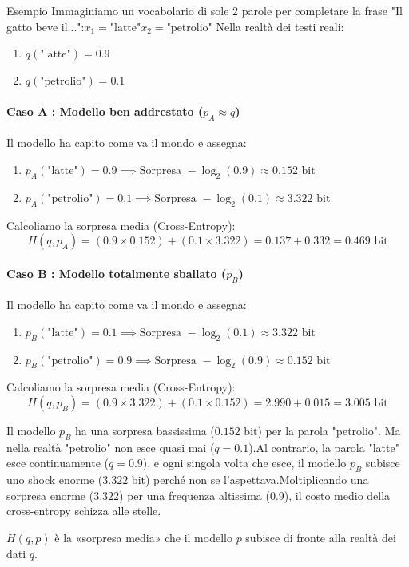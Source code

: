 \begin{example}{Esempio}
    Immaginiamo un vocabolario di sole 2 parole per completare la frase "Il gatto beve il...":$x_1 = \text{"latte"}$$x_2 = \text{"petrolio"}$
    Nella realtà dei testi reali:
    \begin{enumerate}
        \item $q(\text{"latte"}) = 0.9$
        \item $q(\text{"petrolio"}) = 0.1$
    \end{enumerate}
    \paragraph{Caso A : Modello ben addrestato ($p_A \approx q$)}
    Il modello ha capito come va il mondo e assegna:
    \begin{enumerate}
        \item $p_A(\text{"latte"}) = 0.9 \implies \text{Sorpresa } -\log_2(0.9) \approx 0.152 \text{ bit}$
        \item $p_A(\text{"petrolio"}) = 0.1 \implies \text{Sorpresa } -\log_2(0.1) \approx 3.322 \text{ bit}$
    \end{enumerate}
    Calcoliamo la sorpresa media (Cross-Entropy):$$H(q, p_A) = (0.9 \times 0.152) + (0.1 \times 3.322) = 0.137 + 0.332 = 0.469 \text{ bit}$$
    \paragraph{Caso B : Modello totalmente sballato ($p_B$)}
    Il modello ha capito come va il mondo e assegna:
    \begin{enumerate}
        \item $p_B(\text{"latte"}) = 0.1 \implies \text{Sorpresa } -\log_2(0.1) \approx 3.322 \text{ bit}$
        \item $p_B(\text{"petrolio"}) = 0.9 \implies \text{Sorpresa } -\log_2(0.9) \approx 0.152 \text{ bit}$
    \end{enumerate}
    Calcoliamo la sorpresa media (Cross-Entropy):$$H(q, p_B) = (0.9 \times 3.322) + (0.1 \times 0.152) = 2.990 + 0.015 = 3.005 \text{ bit}$$

    Il modello $p_B$ ha una sorpresa bassissima ($0.152\text{ bit}$) per la parola "petrolio". Ma nella realtà "petrolio" non esce quasi mai ($q=0.1$).Al contrario, la parola "latte" esce continuamente ($q=0.9$), e ogni singola volta che esce, il modello $p_B$ subisce uno shock enorme ($3.322\text{ bit}$) perché non se l'aspettava.Moltiplicando una sorpresa enorme ($3.322$) per una frequenza altissima ($0.9$), il costo medio della cross-entropy schizza alle stelle.
\end{example}
\begin{center}
    $H(q,p)$ è la «sorpresa media» che il modello $p$ subisce di fronte alla realtà dei dati $q$.   
\end{center}



